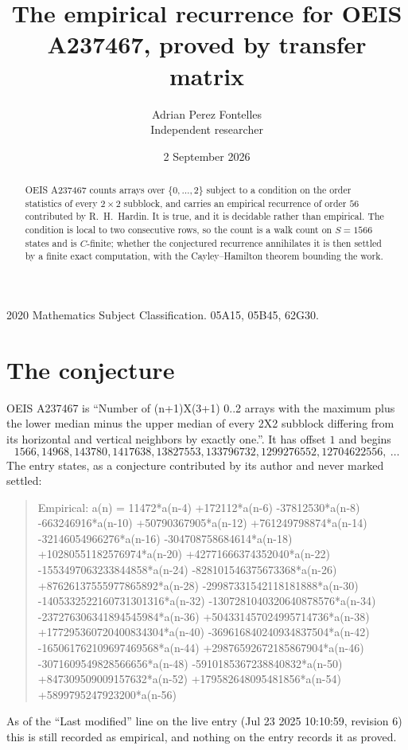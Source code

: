 \documentclass[11pt,a4paper]{article}
\title{The empirical recurrence for OEIS A237467, proved by transfer matrix}
\author{Adrian Perez Fontelles\\ \small Independent researcher}
\date{2 September 2026}
\theoremstyle{plain}
\theoremstyle{definition}
\begin{document}
\maketitle

\begin{abstract}
OEIS A237467 counts arrays over $\{0,\dots,2\}$ subject to a condition on the order
statistics of every $2\times2$ subblock, and carries an empirical recurrence of order
$56$ contributed by R.~H.~Hardin. It is true, and it is decidable rather than empirical.
The condition is local to two consecutive rows, so the count is a walk count on $S=1566$
states and is $C$-finite; whether the conjectured recurrence annihilates it is then settled by
a finite exact computation, with the Cayley--Hamilton theorem bounding the work.
\end{abstract}

\noindent\small 2020 Mathematics Subject Classification. 05A15, 05B45, 62G30.\normalsize

\section{The conjecture}

OEIS A237467 is ``Number of (n+1)X(3+1) 0..2 arrays with the maximum plus the lower median minus the upper median of every 2X2 subblock differing from its horizontal and vertical neighbors by exactly one.''. It has offset $1$ and begins
\[
1566, 14968, 143780, 1417638, 13827553, 133796732, 1299276552, 12704622556,\ \dots
\]
The entry states, as a conjecture contributed by its author and never marked settled:
\begin{quote}
Empirical: a(n) = 11472*a(n-4) +172112*a(n-6) -37812530*a(n-8) -663246916*a(n-10) +50790367905*a(n-12) +761249798874*a(n-14) -32146054966276*a(n-16) -304708758684614*a(n-18) +10280551182576974*a(n-20) +42771666374352040*a(n-22) -1553497063233844858*a(n-24) -828101546375673368*a(n-26) +87626137555977865892*a(n-28) -29987331542118181888*a(n-30) -1405332522160731301316*a(n-32) -1307281040320640878576*a(n-34) -237276306341894545984*a(n-36) +504331457024995714736*a(n-38) +177295360720400834304*a(n-40) -369616840240934837504*a(n-42) -165061762109697469568*a(n-44) +29876592672185867904*a(n-46) -3071609549828566656*a(n-48) -5910185367238840832*a(n-50) +847309509009157632*a(n-52) +179582648095481856*a(n-54) +5899795247923200*a(n-56)
\end{quote}
As of the ``Last modified'' line on the live entry (Jul 23 2025 10:10:59, revision 6) this is still
recorded as empirical, and nothing on the entry records it as proved.
\end{document}
